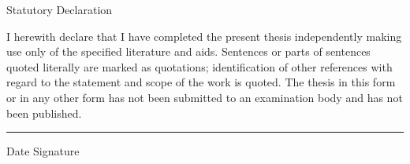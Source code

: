 \thispagestyle{plain} 

\begin{center}
	\LARGE

	\vspace{3ex} Statutory Declaration
\end{center}

\normalsize

I herewith declare that I have completed the present thesis independently making use only of 
the specified literature and aids. Sentences or parts of sentences quoted literally are marked as 
quotations; identification of other references with regard to the statement and scope of the 
work is quoted. The thesis in this form or in any other form has not been submitted to an 
examination body and has not been published. 

\vspace*{2cm}

\begin{flushright}
	\begin{minipage}[r]{10cm}
		\hrule\vspace*{1ex}\hspace{0.3cm} Date \hspace{1.5cm} Signature\\
		\vspace{1cm}
	\end{minipage}
\end{flushright}
